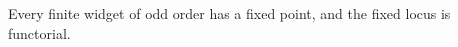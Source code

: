 \begin{mainthm}\label{sy-000B-ai}
Every finite widget of odd order has a fixed point, and the fixed locus is functorial.
\end{mainthm}